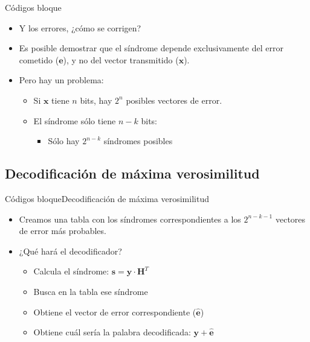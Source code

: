 \documentclass[10pt,compress]{beamer} %
\begin{document}
\begin{frame}{Códigos bloque}
  \begin{itemize}
    \item Y los errores, ¿cómo se corrigen?
    \item Es posible demostrar que el síndrome depende exclusivamente del error cometido ($\mathbf{e}$), y no del vector transmitido ($\mathbf{x}$).
    \item Pero hay un problema:
    \begin{itemize}
      \item Si $\mathbf{x}$ tiene $n$ bits, hay $2^n$ posibles vectores de error.
      \item El síndrome sólo tiene $n-k$ bits:
      \begin{itemize}
        \item Sólo hay $2^{n-k}$ síndromes posibles
      \end{itemize}
    \end{itemize}
  \end{itemize}
\end{frame}

\subsection{Decodificación de máxima verosimilitud}
\begin{frame}{Códigos bloque}{Decodificación de máxima verosimilitud}
  \begin{itemize}
    \item Creamos una tabla con los síndromes correspondientes a los $2^{n-k-1}$ vectores de error más probables.
    \item ¿Qué hará el decodificador?
    \begin{itemize}
      \item Calcula el síndrome: $\mathbf{s} = \mathbf{y} \cdot \mathbf{H}^T$
      \item Busca en la tabla ese síndrome
      \item Obtiene el vector de error correspondiente ($\mathbf{\hat{e}}$)
      \item Obtiene cuál sería la palabra decodificada: $\mathbf{y} + \mathbf{\hat{e}}$
    \end{itemize}
  \end{itemize}
\end{frame}
\end{document}
